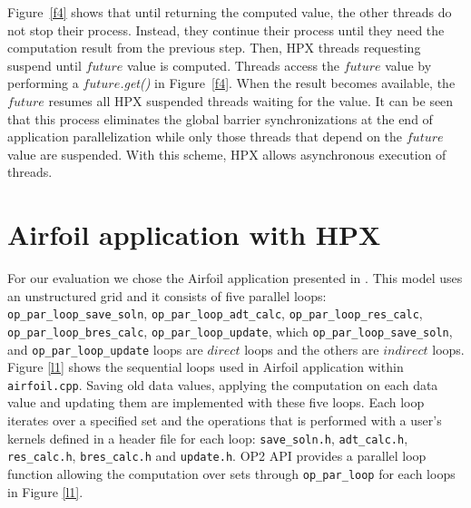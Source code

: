 \documentclass[conference]{IEEEtran}
\begin{document}
Figure~\ref{f4} shows that until returning the computed value, the other threads do not stop their process. Instead, they continue their process until they need the computation result from the previous step. Then, HPX threads requesting suspend until $future$ value is computed. Threads access the $future$ value by performing a \textit{$future$.get()} in Figure~\ref{f4}. When the result becomes available, the \textit{$future$} resumes all HPX suspended threads waiting for the value. It can be seen that this process eliminates the global barrier synchronizations at the end of application parallelization while only those threads that depend on the $future$ value are suspended. With this scheme, HPX allows asynchronous execution of threads.


\section{Airfoil application with HPX}
\label{sec:air}

For our evaluation we chose the Airfoil application presented in \cite{o8}. This model uses an unstructured grid and it consists of five parallel loops: \texttt{op\_par\_loop\_save\_soln}, \texttt{op\_par\_loop\_adt\_calc}, \texttt{op\_par\_loop\_res\_calc}, \texttt{op\_par\_loop\_bres\_calc}, \texttt{op\_par\_loop\_update}, which \texttt{op\_par\_loop\_save\_soln},  and \texttt{op\_par\_loop\_update} loops are $direct$ loops and the others are $indirect$ loops. Figure \ref{l1} shows the sequential loops used in Airfoil application within \texttt{airfoil.cpp}. Saving old data values, applying the computation on each data value and updating them are implemented with these five loops. Each loop iterates over a specified set and the operations that is performed with a user's kernels defined in a header file for each loop: \texttt{save\_soln.h}, \texttt{adt\_calc.h}, \texttt{res\_calc.h}, \texttt{bres\_calc.h} and \texttt{update.h}.  OP2 API provides a parallel loop function allowing the computation over sets through \texttt{op\_par\_loop} for each loops in Figure \ref{l1}. 
\end{document}
